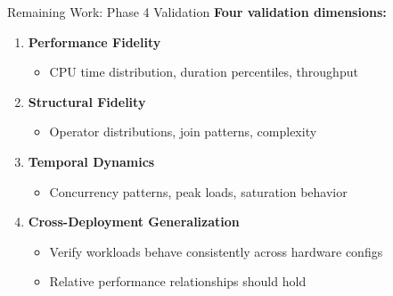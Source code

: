 \documentclass[aspectratio=169]{beamer}
\begin{document}
\begin{frame}{Remaining Work: Phase 4 Validation}
    \textbf{Four validation dimensions:}
    
    \begin{enumerate}
        \item \textbf{Performance Fidelity}
        \begin{itemize}
            \item CPU time distribution, duration percentiles, throughput
        \end{itemize}
        
        \item \textbf{Structural Fidelity}
        \begin{itemize}
            \item Operator distributions, join patterns, complexity
        \end{itemize}
        
        \item \textbf{Temporal Dynamics}
        \begin{itemize}
            \item Concurrency patterns, peak loads, saturation behavior
        \end{itemize}
        
        \item \textbf{Cross-Deployment Generalization}
        \begin{itemize}
            \item Verify workloads behave consistently across hardware configs
            \item Relative performance relationships should hold
        \end{itemize}
    \end{enumerate}
\end{frame}
\end{document}
